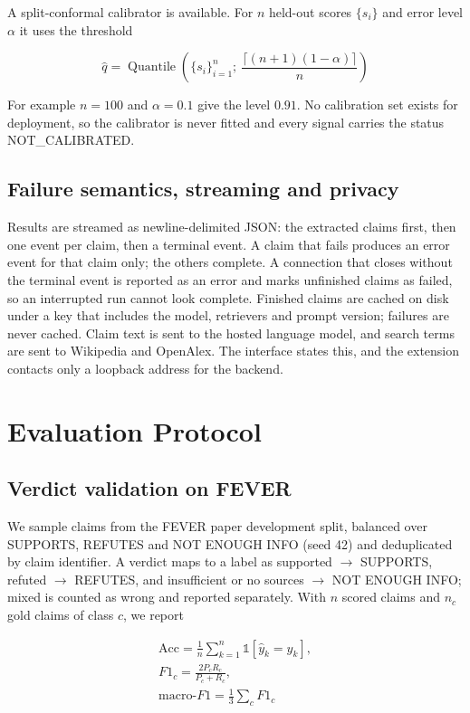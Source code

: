 \documentclass[conference]{IEEEtran}
\begin{document}
A split-conformal calibrator \cite{angelopoulos2021} is available. For $n$ held-out scores $\{s_i\}$ and error level $\alpha$ it uses the threshold

\begin{equation}
\hat{q} = \operatorname{Quantile}\!\left(\{s_i\}_{i=1}^{n};\ \frac{\lceil (n+1)(1-\alpha) \rceil}{n}\right)
\end{equation}

For example $n=100$ and $\alpha=0.1$ give the level $0.91$. No calibration set exists for deployment, so the calibrator is never fitted and every signal carries the status NOT\_CALIBRATED.

\subsection{Failure semantics, streaming and privacy}

Results are streamed as newline-delimited JSON: the extracted claims first, then one event per claim, then a terminal event. A claim that fails produces an error event for that claim only; the others complete. A connection that closes without the terminal event is reported as an error and marks unfinished claims as failed, so an interrupted run cannot look complete. Finished claims are cached on disk under a key that includes the model, retrievers and prompt version; failures are never cached. Claim text is sent to the hosted language model, and search terms are sent to Wikipedia and OpenAlex. The interface states this, and the extension contacts only a loopback address for the backend.

\section{Evaluation Protocol}
\subsection{Verdict validation on FEVER}

We sample claims from the FEVER paper development split, balanced over SUPPORTS, REFUTES and NOT ENOUGH INFO (seed 42) and deduplicated by claim identifier. A verdict maps to a label as supported $\to$ SUPPORTS, refuted $\to$ REFUTES, and insufficient or no sources $\to$ NOT ENOUGH INFO; mixed is counted as wrong and reported separately. With $n$ scored claims and $n_c$ gold claims of class $c$, we report

\begin{equation}
\begin{aligned}
\mathrm{Acc} = \frac{1}{n}\sum_{k=1}^{n}\mathbb{1}[\hat{y}_k = y_k], \\
F1_c = \frac{2P_cR_c}{P_c+R_c}, \\
\text{macro-}F1 = \frac{1}{3}\sum_{c} F1_c
\end{aligned}
\end{equation}
\end{document}

